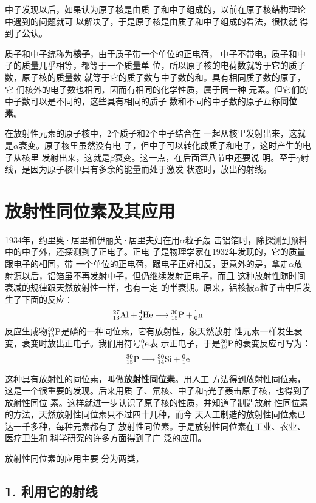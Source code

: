 中子发现以后，如果认为原子核是由质
子和中子组成的，以前在原子核结构理论中遇到的问题就可
以解决了，于是原子核是由质子和中子组成的看法，很快就
得到了公认。

质子和中子统称为\textbf{核子}，由于质子带一个单位的正电荷，
中子不带电，质子和中子的质量几乎相等，都等于一个质量单
位，所以原子核的电荷数就等于它的质子数，原子核的质量数
就等于它的质子数与中子数的和。具有相同质子数的原子，它
们核外的电子数也相同，因而有相同的化学性质，属于同一种
元素。但它们的中子数可以是不同的，这些具有相同的质子
数和不同的中子数的原子互称\textbf{同位素}。

在放射性元素的原子核中，2个质子和2个中子结合在
一起从核里发射出来，这就是$\alpha$衰变。原子核里虽然没有电
子，但中子可以转化成质子和电子，这时产生的电子从核里
发射出来，这就是$\beta$衰变。这一点，在后面第八节中还要说
明。至于$\gamma$射线，是因为原子核中具有多余的能量而处于激发
状态时，放出的射线。


\section{放射性同位素及其应用}
1934年，约里奥·居里和伊丽芙·居里夫妇在用$\alpha$粒子轰
击铝箔时，除探测到预料中的中子外，还探测到了正电子。正电
子是物理学家在1932年发现的，它的质量跟电子的相同，带
一个单位的正电荷，跟电子正好相反，更意外的是，拿走$\alpha$放
射源以后，铝箔虽不再发射中子，但仍继续发射正电子，而且
这种放射性随时间衰减的规律跟天然放射性一样，也有一定
的半衰期。原来，铝核被$\alpha$粒子击中后发生了下面的反应：
\[\atom{Al}{27}{13}+\atom{He}{4}{2}\longrightarrow\atom{P}{30}{15}+\atom{n}{1}{0}  \]
反应生成物$\atom{P}{30}{15}$是磷的一种同位素，它有放射性，象天然放射
性元素一样发生衰变，衰变时放出正电子。我们用符号$\atom{e}{0}{1}$表
示正电子，于是$\atom{P}{30}{15}$的衰变反应可写为：
\[\atom{P}{30}{15}\longrightarrow \atom{Si}{30}{14}+\atom{e}{0}{1} \]

这种具有放射性的同位素，叫做\textbf{放射性同位素}。用人工
方法得到放射性同位素，这是一个很重要的发现。后来用质
子、氘核、中子和$\gamma$光子轰击原子核，也得到了放射性同位
素。这样就进一步认识了原子核的性质，并知道了制造放射
性同位素的方法，天然放射性同位素只不过四十几种，而今
天人工制造的放射性同位素已
达一千多种，每种元素都有了
放射性同位素。于是放射性同位素在工业、农业、医疗卫生和
科学研究的许多方面得到了广
泛的应用。

放射性同位素的应用主要
分为两类，

\subsection*{1. 利用它的射线}

